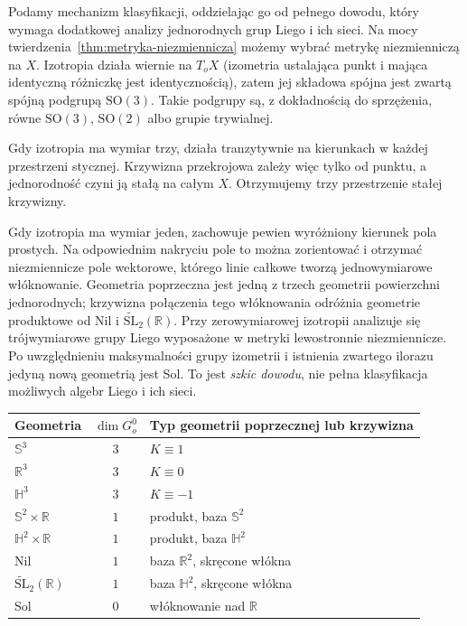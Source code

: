 Podamy mechanizm klasyfikacji, oddzielając go od pełnego dowodu, który
wymaga dodatkowej analizy jednorodnych grup Liego i ich sieci.
Na mocy twierdzenia~\ref{thm:metryka-niezmiennicza} możemy wybrać
metrykę niezmienniczą na $X$. Izotropia działa wiernie na $T_oX$
(izometria ustalająca punkt i mająca identyczną różniczkę jest
identycznością), zatem jej składowa spójna jest zwartą spójną
podgrupą $\mathrm{SO}(3)$. Takie podgrupy są, z dokładnością do
sprzężenia, równe $\mathrm{SO}(3)$, $\mathrm{SO}(2)$ albo grupie
trywialnej.

Gdy izotropia ma wymiar trzy, działa tranzytywnie na kierunkach
w każdej przestrzeni stycznej. Krzywizna przekrojowa zależy więc
tylko od punktu, a jednorodność czyni ją stałą na całym $X$.
Otrzymujemy trzy przestrzenie stałej krzywizny.

Gdy izotropia ma wymiar jeden, zachowuje pewien wyróżniony kierunek
pola prostych. Na odpowiednim nakryciu pole to można zorientować i
otrzymać niezmiennicze pole wektorowe, którego linie całkowe tworzą
jednowymiarowe włóknowanie. Geometria poprzeczna jest jedną z trzech
geometrii powierzchni jednorodnych; krzywizna połączenia tego
włóknowania odróżnia geometrie produktowe od Nil i
$\widetilde{\mathrm{SL}}_2(\mathbb R)$. Przy zerowymiarowej izotropii
analizuje się trójwymiarowe grupy Liego wyposażone w metryki
lewostronnie niezmiennicze. Po uwzględnieniu maksymalności grupy
izometrii i istnienia zwartego ilorazu jedyną nową geometrią jest Sol.
To jest \emph{szkic dowodu}, nie pełna klasyfikacja możliwych algebr
Liego i ich sieci.

\begin{center}
\begin{tabular}{|l|c|l|}
\hline
Geometria & $\dim G_o^0$ & Typ geometrii poprzecznej lub krzywizna \\
\hline
$\mathbb S^3$ & $3$ & $K\equiv 1$ \\
$\mathbb R^3$ & $3$ & $K\equiv 0$ \\
$\mathbb H^3$ & $3$ & $K\equiv -1$ \\
$\mathbb S^2\times\mathbb R$ & $1$ & produkt, baza $\mathbb S^2$ \\
$\mathbb H^2\times\mathbb R$ & $1$ & produkt, baza $\mathbb H^2$ \\
Nil & $1$ & baza $\mathbb R^2$, skręcone włókna \\
$\widetilde{\mathrm{SL}}_2(\mathbb R)$ & $1$ & baza $\mathbb H^2$, skręcone włókna \\
Sol & $0$ & włóknowanie nad $\mathbb R$ \\
\hline
\end{tabular}
\end{center}

